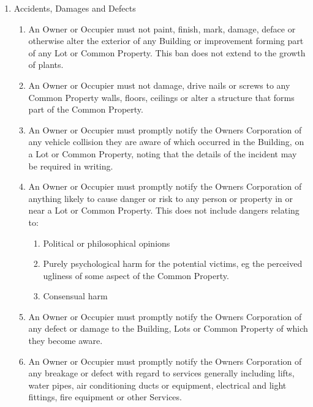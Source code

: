 \documentclass{article}
\begin{document}
\begin{enumerate}[label=\arabic*.]
\begin{enumerate}[label=\arabic{enumi}.\arabic*.]
\begin{enumerate}[label=(\arabic*)]
\end{enumerate}

\item  Accidents, Damages and Defects

\begin{enumerate}[label=(\arabic*)]

\item  An Owner or Occupier must not paint, finish, mark, damage, deface or otherwise alter the exterior of any Building or improvement forming part of any Lot or Common Property. This ban does not extend to the growth of plants.

\item  An Owner or Occupier must not damage, drive nails or screws to any Common Property walls, floors, ceilings or alter a structure that forms part of the Common Property.
\newpage



\item  An Owner or Occupier must promptly notify the Owners Corporation of any vehicle collision they are aware of which occurred in the Building, on a Lot or Common Property, noting that the details of the incident may be required in writing.

\item  An Owner or Occupier must promptly notify the Owners Corporation of anything likely to cause danger or risk to any person or property in or near a Lot or Common Property. This does not include dangers relating to:
\begin{enumerate}[label=(\arabic*)]
    \item Political or philosophical opinions
    \item Purely psychological harm for the potential victims, eg the perceived ugliness of some aspect of the Common Property.
    \item Consensual harm
\end{enumerate}

\item  An Owner or Occupier must promptly notify the Owners Corporation of any defect or damage to the Building, Lots or Common Property of which they become aware.

\item  An Owner or Occupier must promptly notify the Owners Corporation of any breakage or defect with regard to services generally including lifts, water pipes, air conditioning ducts or equipment, electrical and light fittings, fire equipment or other Services.


\end{enumerate}
\end{enumerate}
\end{enumerate}
\end{document}
